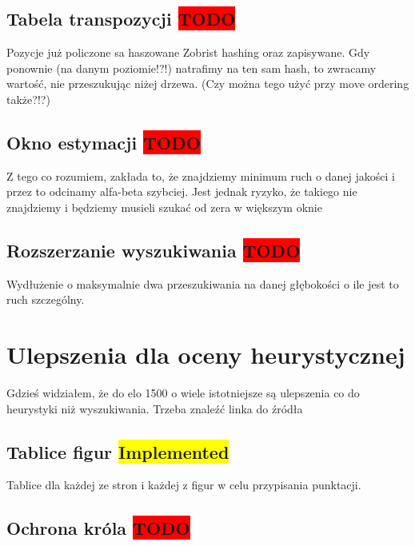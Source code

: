 \subsection{Tabela transpozycji \colorbox{red}{TODO}}
\label{subsec:tabela-transpozycji}

{
    \color{red}
    \large Pozycje już policzone sa haszowane Zobrist hashing oraz zapisywane.
    Gdy ponownie (na danym poziomie!?!) natrafimy na ten sam hash, to zwracamy wartość, nie przeszukując niżej drzewa.
    (Czy można tego użyć przy move ordering także?!?)
}


\subsection{Okno estymacji \colorbox{red}{TODO}}
\label{subsec:okno-estymacji}

{
    \color{red}
    \large Z tego co rozumiem, zakłada to, że znajdziemy minimum ruch o danej jakości i przez to odcinamy alfa-beta szybciej.
Jest jednak ryzyko, że takiego nie znajdziemy i będziemy musieli szukać od zera w większym oknie
}


\subsection{Rozszerzanie wyszukiwania \colorbox{red}{TODO}}
\label{subsec:rozszerzanie-wyszukiwania}

{
    \color{red}
    \large Wydłużenie o maksymalnie dwa przeszukiwania na danej głębokości o ile jest to ruch szczególny.
}


\section{Ulepszenia dla oceny heurystycznej}
\label{sec:ulepszenia-dla-oceny-heurystycznej}

{
    \color{red}
    \large Gdzieś widziałem, że do elo 1500 o wiele istotniejsze są ulepszenia co do heurystyki niż wyszukiwania.
Trzeba znaleźć linka do źródła
}


\subsection{Tablice figur \colorbox{yellow}{Implemented}}
\label{subsec:tablice-figur}

{
    \color{red}
    \large Tablice dla każdej ze stron i każdej z figur w celu przypisania punktacji.
}

\subsection{Ochrona króla \colorbox{red}{TODO}}
\label{subsec:ochrona-krola}

